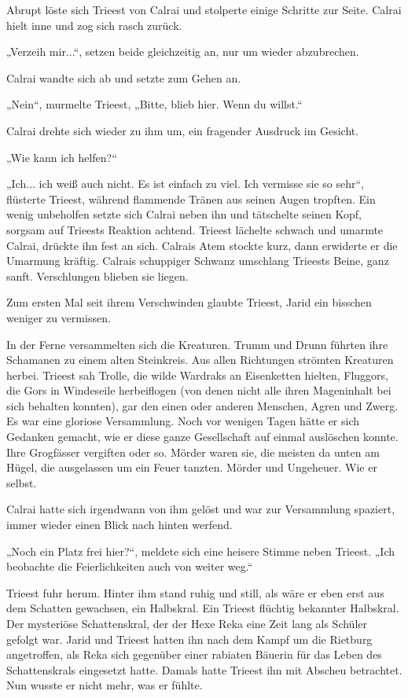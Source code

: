 Abrupt löste sich Trieest von Calrai und stolperte einige Schritte zur Seite. Calrai hielt inne und zog sich rasch zurück.

„Verzeih mir...“, setzen beide gleichzeitig an, nur um wieder abzubrechen.

Calrai wandte sich ab und setzte zum Gehen an.

„Nein“, murmelte Trieest, „Bitte, blieb hier. Wenn du willst.“

Calrai drehte sich wieder zu ihm um, ein fragender Ausdruck im Gesicht.

„Wie kann ich helfen?“

„Ich... ich weiß auch nicht. Es ist einfach zu viel. Ich vermisse sie so sehr“, flüsterte Trieest, während flammende Tränen aus seinen Augen tropften. Ein wenig unbeholfen setzte sich Calrai neben ihn und tätschelte seinen Kopf, sorgsam auf Trieests Reaktion achtend. Trieest lächelte schwach und umarmte Calrai, drückte ihn fest an sich. Calrais Atem stockte kurz, dann erwiderte er die Umarmung kräftig. Calrais schuppiger Schwanz umschlang Trieests Beine, ganz sanft. Verschlungen blieben sie liegen.

Zum ersten Mal seit ihrem Verschwinden glaubte Trieest, Jarid ein bisschen weniger zu vermissen.\bigskip







In der Ferne versammelten sich die Kreaturen. Trumm und Drunn führten ihre Schamanen zu einem alten Steinkreis. Aus allen Richtungen strömten Kreaturen herbei. Trieest sah Trolle, die wilde Wardraks an Eisenketten hielten, Fluggors, die Gors in Windeseile herbeiflogen (von denen nicht alle ihren Mageninhalt bei sich behalten konnten), gar den einen oder anderen Menschen, Agren und Zwerg. Es war eine gloriose Versammlung. Noch vor wenigen Tagen hätte er sich Gedanken gemacht, wie er diese ganze Gesellschaft auf einmal auslöschen konnte. Ihre Grogfässer vergiften oder so. Mörder waren sie, die meisten da unten am Hügel, die ausgelassen um ein Feuer tanzten. Mörder und Ungeheuer. Wie er selbst.

Calrai hatte sich irgendwann von ihm gelöst und war zur Versammlung spaziert, immer wieder einen Blick nach hinten werfend.

„Noch ein Platz frei hier?“, meldete sich eine heisere Stimme neben Trieest. „Ich beobachte die Feierlichkeiten auch von weiter weg.“

Trieest fuhr herum. Hinter ihm stand ruhig und still, als wäre er eben erst aus dem Schatten gewachsen, ein Halbskral. Ein Trieest flüchtig bekannter Halbskral. Der mysteriöse Schattenskral, der der Hexe Reka eine Zeit lang als Schüler gefolgt war. Jarid und Trieest hatten ihn nach dem Kampf um die Rietburg angetroffen, als Reka sich gegenüber einer rabiaten Bäuerin für das Leben des Schattenskrals eingesetzt hatte. Damals hatte Trieest ihn mit Abscheu betrachtet. Nun wusste er nicht mehr, was er fühlte.


